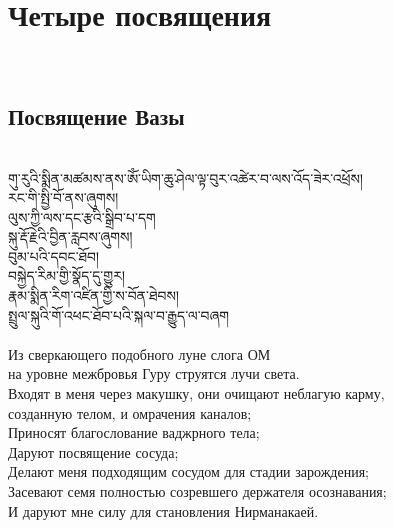 \section{Четыре посвящения}
\\
\subsection{Посвящение Вазы}
\\
\ti
གུ་རུའི་སྨིན་མཚམས་ནས་ཨོཾ་ཡིག་ཆུ་ཤེལ་ལྟ་བུར་འཚེར་བ་ལས་འོད་ཟེར་འཕྲོས།\\
རང་གི་སྤྱི་བོ་ནས་ཞུགས།\\
ལུས་ཀྱི་ལས་དང་རྩའི་སྒྲིབ་པ་དག\\
སྐུ་རྡོ་རྗེའི་བྱིན་རླབས་ཞུགས།\\
བུམ་པའི་དབང་ཐོབ།\\
བསྐྱེད་རིམ་གྱི་སྣོད་དུ་གྱུར།\\
རྣམ་སྨིན་རིག་འཛིན་གྱི་ས་བོན་ཐེབས།\\
སྤྲུལ་སྐུའི་གོ་འཕང་ཐོབ་པའི་སྐལ་བ་རྒྱུད་ལ་བཞག\\
\\
\ru
Из сверкающего подобного луне слога ОМ \\
на уровне межбровья Гуру струятся лучи света.\\
Входят в меня через макушку, они очищают неблагую карму, \\
созданную телом, и омрачения каналов;\\
Приносят благослование ваджрного тела;\\
Даруют посвящение сосуда;\\
Делают меня подходящим сосудом для стадии зарождения;\\
Засевают семя полностью созревшего держателя осознавания;\\
И даруют мне силу для становления Нирманакаей.

\newpage
